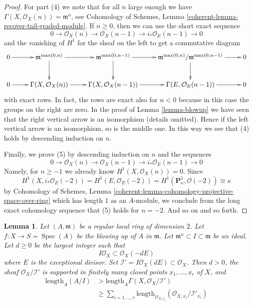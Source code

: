 \documentclass{stacks-project}
\theoremstyle{plain}
\newtheorem{lemma}[subsection]{Lemma}
\theoremstyle{definition}
\theoremstyle{remark}
\numberwithin{equation}{subsection}
\def\Spec{\mathop{\mathrm{Spec}}}
\begin{document}
\begin{proof}
\medskip\noindent
For part (4) we note that for all $n$ large enough we have
$\Gamma(X, \mathcal{O}_X(n)) = \mathfrak m^n$, see
Cohomology of Schemes, Lemma \ref{coherent-lemma-recover-tail-graded-module}.
If $n \geq 0$, then we can use the short exact sequence
$$
0 \to \mathcal{O}_X(n) \to \mathcal{O}_X(n - 1) \to
i_*\mathcal{O}_E(n - 1) \to 0
$$
and the vanishing of $H^1$ for the sheaf on the left to get a commutative
diagram
$$
\xymatrix{
0 \ar[r] &
\mathfrak m^{\max(0, n)} \ar[r] \ar[d] &
\mathfrak m^{\max(0, n - 1)} \ar[r] \ar[d] &
\mathfrak m^{\max(0, n)}/\mathfrak m^{\max(0, n - 1)} \ar[r] \ar[d] & 0\\
0 \ar[r] &
\Gamma(X, \mathcal{O}_X(n)) \ar[r] &
\Gamma(X, \mathcal{O}_X(n - 1)) \ar[r] &
\Gamma(E, \mathcal{O}_E(n - 1)) \ar[r] & 0
}
$$
with exact rows. In fact, the rows are exact also for $n < 0$
because in this case the groups on the right are zero.
In the proof of Lemma \ref{lemma-blowup}
we have seen that the right vertical arrow is an isomorphism
(details omitted). Hence if the left vertical arrow is an isomorphism, so
is the middle one. In this way we see that (4) holds by
descending induction on $n$.

\medskip\noindent
Finally, we prove (5) by descending induction on $n$ and the sequences
$$
0 \to \mathcal{O}_X(n) \to \mathcal{O}_X(n - 1) \to
i_*\mathcal{O}_E(n - 1) \to 0
$$
Namely, for $n \geq -1$ we already know $H^1(X, \mathcal{O}_X(n)) = 0$.
Since
$$
H^1(X, i_*\mathcal{O}_E(-2)) =
H^1(E, \mathcal{O}_E(-2)) =
H^1(\mathbf{P}^1_\kappa, \mathcal{O}(-2)) \cong \kappa
$$
by Cohomology of Schemes, Lemma
\ref{coherent-lemma-cohomology-projective-space-over-ring}
which has length $1$ as an $A$-module, we conclude from the long exact
cohomology sequence that (5) holds for $n = -2$. And so on and so forth.
\end{proof}

\begin{lemma}
\label{lemma-blowup-improve}
Let $(A, \mathfrak m)$ be a regular local ring of dimension $2$.
Let $f : X \to S = \Spec(A)$ be the blowing up of $A$ in $\mathfrak m$.
Let $\mathfrak m^n \subset I \subset \mathfrak m$ be an ideal.
Let $d \geq 0$ be the largest integer such that
$$
I \mathcal{O}_X \subset \mathcal{O}_X(-dE)
$$
where $E$ is the exceptional divisor. Set
$\mathcal{I}' = I\mathcal{O}_X(dE) \subset \mathcal{O}_X$.
Then $d > 0$, the sheaf
$\mathcal{O}_X/\mathcal{I}'$ is supported in finitely many
closed points $x_1, \ldots, x_r$ of $X$, and
\begin{align*}
\text{length}_A(A/I)
& >
\text{length}_A \Gamma(X, \mathcal{O}_X/\mathcal{I}') \\
& \geq
\sum\nolimits_{i = 1, \ldots, r}
\text{length}_{\mathcal{O}_{X, x_i}}
(\mathcal{O}_{X, x_i}/\mathcal{I}'_{x_i})
\end{align*}
\end{lemma}
\end{document}

